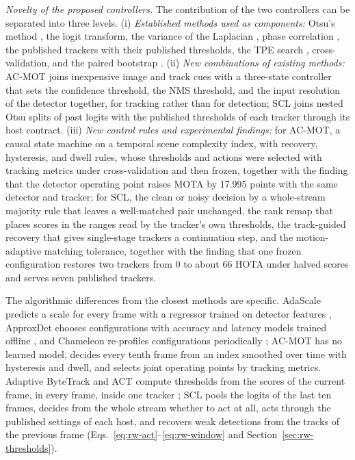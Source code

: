 \emph{Novelty of the proposed controllers.} The contribution of the two controllers can be separated into three levels. (i) \emph{Established methods used as components:} Otsu's method \cite{goh2018otsu}, the logit transform, the variance of the Laplacian \cite{pechpacheco2000blur}, phase correlation \cite{tong2019fourier}, the published trackers with their published thresholds, the TPE search \cite{akiba2019optuna}, cross-validation, and the paired bootstrap \cite{efron2016casi}. (ii) \emph{New combinations of existing methods:} AC-MOT joins inexpensive image and track cues with a three-state controller that sets the confidence threshold, the NMS threshold, and the input resolution of the detector together, for tracking rather than for detection; SCL joins nested Otsu splits of past logits with the published thresholds of each tracker through its host contract. (iii) \emph{New control rules and experimental findings:} for AC-MOT, a causal state machine on a temporal scene complexity index, with recovery, hysteresis, and dwell rules, whose thresholds and actions were selected with tracking metrics under cross-validation and then frozen, together with the finding that the detector operating point raises MOTA by 17.995 points with the same detector and tracker; for SCL, the clean or noisy decision by a whole-stream majority rule that leaves a well-matched pair unchanged, the rank remap that places scores in the ranges read by the tracker's own thresholds, the track-guided recovery that gives single-stage trackers a continuation step, and the motion-adaptive matching tolerance, together with the finding that one frozen configuration restores two trackers from 0 to about 66 HOTA under halved scores and serves seven published trackers.

The algorithmic differences from the closest methods are specific. AdaScale predicts a scale for every frame with a regressor trained on detector features \cite{chin2019adascale}, ApproxDet chooses configurations with accuracy and latency models trained offline \cite{xu2020approxdet}, and Chameleon re-profiles configurations periodically \cite{jiang2018chameleon}; AC-MOT has no learned model, decides every tenth frame from an index smoothed over time with hysteresis and dwell, and selects joint operating points by tracking metrics. Adaptive ByteTrack and ACT compute thresholds from the scores of the current frame, in every frame, inside one tracker \cite{ma2023adaptivebytetrack,act2026adaptive}; SCL pools the logits of the last ten frames, decides from the whole stream whether to act at all, acts through the published settings of each host, and recovers weak detections from the tracks of the previous frame (Eqs.~\eqref{eq:rw-act}--\eqref{eq:rw-window} and Section~\ref{sec:rw-thresholds}).


